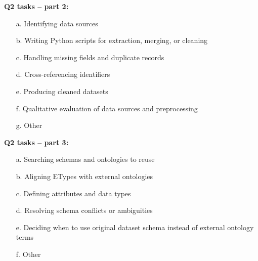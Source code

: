 \textbf{Q2 tasks -- part 2:}
\begin{enumerate}
  \item[a.] Identifying data sources
  \item[b.] Writing Python scripts for extraction, merging, or cleaning
  \item[c.] Handling missing fields and duplicate records
  \item[d.] Cross-referencing identifiers
  \item[e.] Producing cleaned datasets
  \item[f.] Qualitative evaluation of data sources and preprocessing
  \item[g.] Other
\end{enumerate}

\textbf{Q2 tasks -- part 3:}
\begin{enumerate}
  \item[a.] Searching schemas and ontologies to reuse
  \item[b.] Aligning ETypes with external ontologies
  \item[c.] Defining attributes and data types
  \item[d.] Resolving schema conflicts or ambiguities
  \item[e.] Deciding when to use original dataset schema instead of external ontology terms
  \item[f.] Other
\end{enumerate}

